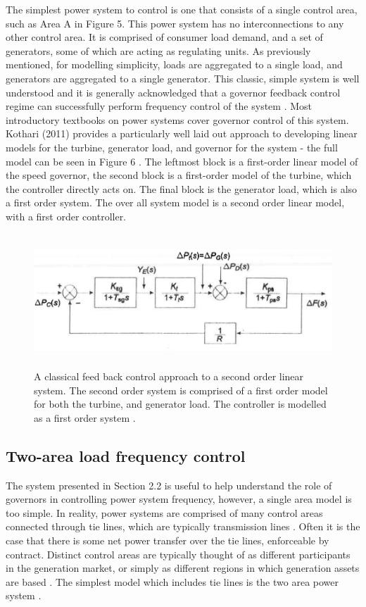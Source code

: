 \documentclass[12pt, a4paper]{article}
\begin{document}
The simplest power system to control is one that consists of a single control area, such as Area A in Figure 5. This power system has no interconnections to any other control area. It is comprised of consumer load demand, and a set of generators, some of which are acting as regulating units. As previously mentioned, for modelling simplicity, loads are aggregated to a single load, and generators are aggregated to a single generator. This classic, simple system is well understood and it is generally acknowledged that a governor feedback control regime can successfully perform frequency control of the system \cite{Wood2013, Grainger1994, Kothari2011}. Most introductory textbooks on power systems cover governor control of this system. Kothari (2011) provides a particularly well laid out approach to developing linear models for the turbine, generator load, and governor for the system - the full model can be seen in Figure 6 \cite{Kothari2011}. The leftmost block is a first-order linear model of the speed governor, the second block is a first-order model of the turbine, which the controller directly acts on. The final block is the generator load, which is also a first order system. The over all system model is a second order linear model, with a first order controller.

\begin{figure}[h]
\centering
\includegraphics[height=5cm]{single_area_control}
\caption{A classical feed back control approach to a second order linear system. The second order system is comprised of a first order model for both the turbine, and generator load. The controller is modelled as a first order system \cite{Kothari2011}.}
\end{figure}


\subsection{Two-area load frequency control}
The system presented in Section 2.2 is useful to help understand the role of governors in controlling power system frequency, however, a single area model is too simple. In reality, power systems are comprised of many control areas connected through tie lines, which are typically transmission lines \cite{NPTEL202002}. Often it is the case that there is some net power transfer over the tie lines, enforceable by contract. Distinct control areas are typically thought of as different participants in the generation market, or simply as different regions in which generation assets are based \cite{NPTEL202002}. The simplest model which includes tie lines is the two area power system \cite{Kothari2011}.
\end{document}
